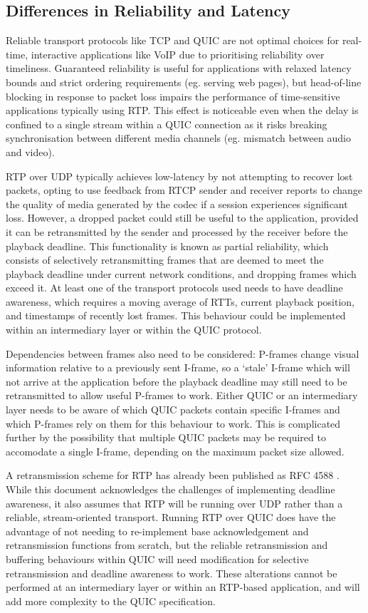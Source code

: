 \documentclass{mprop}
\begin{document}
\subsection{Differences in Reliability and Latency}

Reliable transport protocols like TCP and QUIC are not optimal choices for real-time, interactive 
applications like VoIP due to prioritising reliability over timeliness. Guaranteed reliability is 
useful for applications with relaxed latency bounds and strict ordering requirements (eg. serving 
web pages), but head-of-line blocking in response to packet loss impairs the performance of time-sensitive applications typically using RTP. This effect is noticeable even when the delay is confined to a single stream within a QUIC connection as it risks breaking synchronisation between different media channels (eg. mismatch between audio and video).

RTP over UDP typically achieves low-latency by not attempting to recover lost packets, opting to use feedback from RTCP sender and receiver reports to change the quality of media generated by the codec if a session experiences significant loss. However, a dropped packet could still be useful to the application, provided it can be retransmitted by the sender and processed by the receiver before the playback deadline. This functionality is known as partial reliability, which consists of selectively retransmitting frames that are deemed to meet the playback deadline under current network conditions, and dropping frames which exceed it. At least one of the transport protocols used needs to have deadline awareness, which requires a moving average of RTTs, current playback position, and timestamps of recently lost frames. This behaviour could be implemented within an intermediary layer or within the QUIC protocol.

Dependencies between frames also need to be considered: P-frames change visual information relative to a previously sent I-frame, so a `stale' I-frame which will not arrive at the application before the playback deadline may still need to be retransmitted to allow useful P-frames to work. Either QUIC or an intermediary layer needs to be aware of which QUIC packets contain specific I-frames and which P-frames rely on them for this behaviour to work. This is complicated further by the possibility that multiple QUIC packets may be required to accomodate a single I-frame, depending on the maximum packet size allowed.

A retransmission scheme for RTP has already been published as RFC 4588 \cite{RTP-retransmission-RFC}. While this document acknowledges the challenges of implementing deadline awareness, it also assumes that RTP will be running over UDP rather than a reliable, stream-oriented transport. Running RTP over QUIC does have the advantage of not needing to re-implement base acknowledgement and retransmission functions from scratch, but the reliable retransmission and buffering behaviours within QUIC will need modification for selective retransmission and deadline awareness to work. These alterations cannot be performed at an intermediary layer or within an RTP-based application, and will add more complexity to the QUIC specification.
\end{document}

